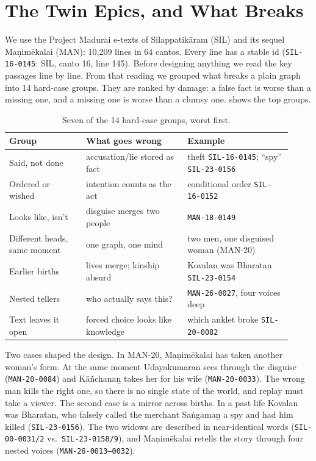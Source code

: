 \documentclass[11pt]{article}
\newcommand{\lid}[1]{\texttt{\small #1}}
\begin{document}
\section{The Twin Epics, and What Breaks}
\label{sec:data}

We use the Project Madurai e-texts of Silappatik\={a}ram (SIL) and its sequel Ma\d{n}im\={e}kalai (MAN): 10,209 lines in 64 cantos. Every line has a stable id (\lid{SIL-16-0145}: SIL, canto 16, line 145). Before designing anything we read the key passages line by line. From that reading we grouped what breaks a plain graph into 14 hard-case groups. They are ranked by damage: a false fact is worse than a missing one, and a missing one is worse than a clumsy one.  shows the top groups.

\begin{table}[t]
\centering\small
\setlength{\tabcolsep}{3pt}
\begin{tabular}{@{}p{0.25\linewidth}p{0.33\linewidth}p{0.34\linewidth}@{}}
\toprule
Group & What goes wrong & Example \\
\midrule
Said, not done & accusation/lie stored as fact & theft \lid{SIL-16-0145}; ``spy'' \lid{SIL-23-0156} \\
Ordered or wished & intention counts as the act & conditional order \lid{SIL-16-0152} \\
Looks like, isn't & disguise merges two people & \lid{MAN-18-0149} \\
Different heads, same moment & one graph, one mind & two men, one disguised woman (MAN-20) \\
Earlier births & lives merge; kinship absurd & Kovalan was Bharatan \lid{SIL-23-0154} \\
Nested tellers & who actually says this? & \lid{MAN-26-0027}, four voices deep \\
Text leaves it open & forced choice looks like knowledge & which anklet broke \lid{SIL-20-0082} \\
\bottomrule
\end{tabular}
\caption{Seven of the 14 hard-case groups, worst first.}
\label{tab:hard}
\end{table}

Two cases shaped the design. In MAN-20, Ma\d{n}im\={e}kalai has taken another woman's form. At the same moment Udayakumaran sees through the disguise (\lid{MAN-20-0084}) and K\={a}ñchana\b{n} takes her for his wife (\lid{MAN-20-0033}). The wrong man kills the right one, so there is no single state of the world, and replay must take a viewer. The second case is a mirror across births. In a past life Kovalan was Bharatan, who falsely called the merchant Sa\.{n}gama\b{n} a spy and had him killed (\lid{SIL-23-0156}). The two widows are described in near-identical words (\lid{SIL-00-0031/2} vs.\ \lid{SIL-23-0158/9}), and Ma\d{n}im\={e}kalai retells the story through four nested voices (\lid{MAN-26-0013--0032}).
\end{document}
